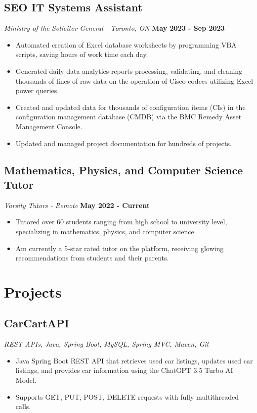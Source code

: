 \documentclass{article}
\begin{document}
\subsection*{SEO IT Systems Assistant}
\textit{Ministry of the Solicitor General - Toronto, ON}
\hfill
\textbf{May 2023 - Sep 2023}
\begin{itemize}
    \item Automated creation of Excel database worksheets by programming VBA scripts, saving hours of work time each day.
    \item Generated daily data analytics reports processing, validating, and cleaning thousands of lines of raw data on the operation of Cisco codecs utilizing Excel power queries.
    \item Created and updated data for thousands of configuration items (CIs) in the configuration management database (CMDB) via the BMC Remedy Asset Management Console.
    \item Updated and managed project documentation for hundreds of projects.
\end{itemize}

\subsection*{Mathematics, Physics, and Computer Science Tutor}
\textit{Varsity Tutors - Remote}
\hfill
\textbf{May 2022 - Current}
\begin{itemize}
    \item Tutored over 60 students ranging from high school to university level, specializing in mathematics, physics, and computer science.
    \item Am currently a 5-star rated tutor on the platform, receiving glowing recommendations from students and their parents.
\end{itemize}

\section*{Projects}

\subsection*{CarCartAPI}
\textit{REST APIs, Java, Spring Boot, MySQL, Spring MVC, Maven, Git}
\begin{itemize}
    \item Java Spring Boot REST API that retrieves used car listings, updates used car listings, and provides car information using the ChatGPT 3.5 Turbo AI Model.
    \item Supports GET, PUT, POST, DELETE requests with fully multithreaded calls.
\end{itemize}
\end{document}
